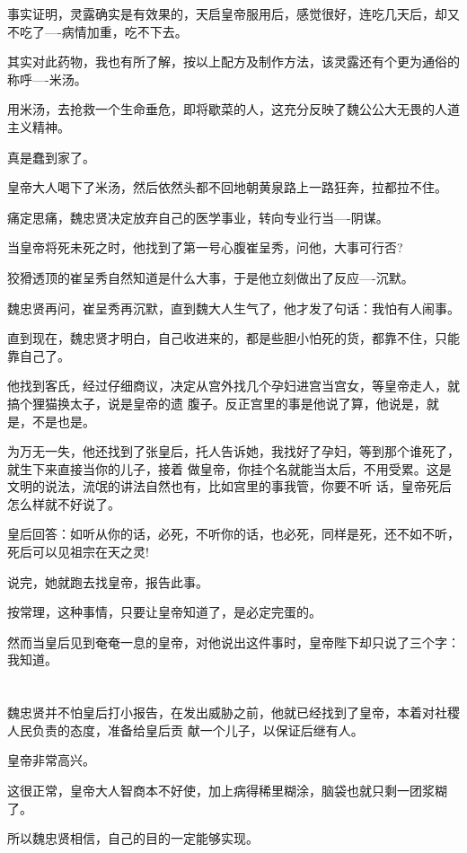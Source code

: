 \documentclass[11pt,a4paper,onecolumn]{article}
\begin{document}
事实证明，灵露确实是有效果的，天启皇帝服用后，感觉很好，连吃几天后，却又不吃了----病情加重，吃不下去。

其实对此药物，我也有所了解，按以上配方及制作方法，该灵露还有个更为通俗的称呼----米汤。

用米汤，去抢救一个生命垂危，即将歇菜的人，这充分反映了魏公公大无畏的人道主义精神。

真是蠢到家了。

皇帝大人喝下了米汤，然后依然头都不回地朝黄泉路上一路狂奔，拉都拉不住。

痛定思痛，魏忠贤决定放弃自己的医学事业，转向专业行当----阴谋。

当皇帝将死未死之时，他找到了第一号心腹崔呈秀，问他，大事可行否?

狡猾透顶的崔呈秀自然知道是什么大事，于是他立刻做出了反应----沉默。

魏忠贤再问，崔呈秀再沉默，直到魏大人生气了，他才发了句话：我怕有人闹事。

直到现在，魏忠贤才明白，自己收进来的，都是些胆小怕死的货，都靠不住，只能靠自己了。

他找到客氏，经过仔细商议，决定从宫外找几个孕妇进宫当宫女，等皇帝走人，就搞个狸猫换太子，说是皇帝的遗
腹子。反正宫里的事是他说了算，他说是，就是，不是也是。

为万无一失，他还找到了张皇后，托人告诉她，我找好了孕妇，等到那个谁死了，就生下来直接当你的儿子，接着
做皇帝，你挂个名就能当太后，不用受累。这是文明的说法，流氓的讲法自然也有，比如宫里的事我管，你要不听
话，皇帝死后怎么样就不好说了。

皇后回答：如听从你的话，必死，不听你的话，也必死，同样是死，还不如不听，死后可以见祖宗在天之灵!

说完，她就跑去找皇帝，报告此事。

按常理，这种事情，只要让皇帝知道了，是必定完蛋的。

然而当皇后见到奄奄一息的皇帝，对他说出这件事时，皇帝陛下却只说了三个字：我知道。

\section[\thesection]{}

魏忠贤并不怕皇后打小报告，在发出威胁之前，他就已经找到了皇帝，本着对社稷人民负责的态度，准备给皇后贡
献一个儿子，以保证后继有人。

皇帝非常高兴。

这很正常，皇帝大人智商本不好使，加上病得稀里糊涂，脑袋也就只剩一团浆糊了。

所以魏忠贤相信，自己的目的一定能够实现。
\end{document}

